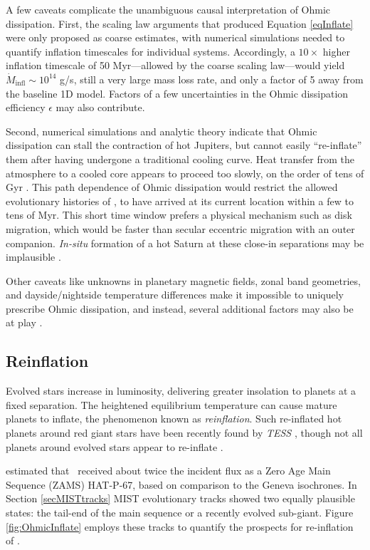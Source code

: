 \documentclass[twocolumn]{aastex631}
\newcommand{\hatpb}{\object{HAT-P-67 b}}
\begin{document}
A few caveats complicate the unambiguous causal interpretation of Ohmic dissipation.  First, the scaling law arguments that produced Equation \ref{eqInflate} were only proposed as coarse estimates, with numerical simulations needed to quantify inflation timescales for individual systems.  Accordingly, a $10\times$ higher inflation timescale of 50 Myr---allowed by the coarse scaling law---would yield $\dot{M}_\mathrm{infl}\sim10^{14}$ g/s, still a very large mass loss rate, and only a factor of 5 away from the baseline 1D model.  Factors of a few uncertainties in the Ohmic dissipation efficiency $\epsilon$ may also contribute.

Second, numerical simulations \citep{2013ApJ...763...13W} and analytic theory \citep{2016ApJ...819..116G} indicate that Ohmic dissipation can stall the contraction of hot Jupiters, but cannot easily ``re-inflate'' them after having undergone a traditional cooling curve.  Heat transfer from the atmosphere to a cooled core appears to proceed too slowly, on the order of tens of Gyr \citep{2016ApJ...819..116G}.  This path dependence of Ohmic dissipation would restrict the allowed evolutionary histories of \hatpb, to have arrived at its current location within a few to tens of Myr.  This short time window prefers a physical mechanism such as disk migration, which would be faster than secular eccentric migration with an outer companion. \emph{In-situ} formation of a hot Saturn at these close-in separations may be implausible \citep{2018ARA&A..56..175D}.  

Other caveats like unknowns in planetary magnetic fields, zonal band geometries, and dayside/nightside temperature differences make it impossible to uniquely prescribe Ohmic dissipation, and instead, several additional factors may also be at play \citep{2021A&A...645A..79S}.


\subsection{Reinflation}
Evolved stars increase in luminosity, delivering greater insolation to planets at a fixed separation.  The heightened equilibrium temperature can cause mature planets to inflate, the phenomenon known as \emph{reinflation}.  Such re-inflated hot planets around red giant stars have been recently found by \emph{TESS} \citep{2022AJ....163..120G,2023arXiv230306728G}, though not all planets around evolved stars appear to re-inflate \citep{2022AJ....163...53S}.

\citet{2017AJ....153..211Z} estimated that \hatpb~received about twice the incident flux as a Zero Age Main Sequence (ZAMS) HAT-P-67, based on comparison to the Geneva isochrones. In Section \ref{secMISTtracks} MIST evolutionary tracks showed two equally plausible states: the tail-end of the main sequence or a recently evolved sub-giant.  Figure \ref{fig:OhmicInflate} employs these tracks to quantify the prospects for re-inflation  of \hatpb.  
\end{document}
